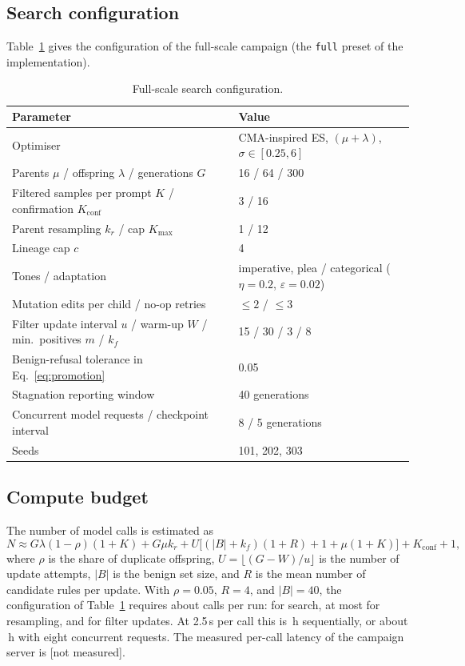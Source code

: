 \documentclass[preprint,12pt,authoryear]{elsarticle}
\newcommand{\nm}{[not measured]}
\begin{document}
\subsection{Search configuration}
Table~\ref{tab:config} gives the configuration of the full-scale campaign (the \texttt{full} preset of the implementation).

\begin{table}[t]
\centering
\caption{Full-scale search configuration.}
\label{tab:config}
\footnotesize
\begin{tabular}{@{}ll@{}}
\toprule
Parameter & Value \\
\midrule
Optimiser & CMA-inspired ES, $(\mu+\lambda)$, $\sigma\in[0.25,6]$ \\
Parents $\mu$ / offspring $\lambda$ / generations $G$ & 16 / 64 / 300 \\
Filtered samples per prompt $K$ / confirmation $K_{\mathrm{conf}}$ & 3 / 16 \\
Parent resampling $k_r$ / cap $K_{\max}$ & 1 / 12 \\
Lineage cap $c$ & 4 \\
Tones / adaptation & imperative, plea / categorical ($\eta=0.2$, $\varepsilon=0.02$) \\
Mutation edits per child / no-op retries & $\leq 2$ / $\leq 3$ \\
Filter update interval $u$ / warm-up $W$ / min.\ positives $m$ / $k_f$ & 15 / 30 / 3 / 8 \\
Benign-refusal tolerance in Eq.~\eqref{eq:promotion} & 0.05 \\
Stagnation reporting window & 40 generations \\
Concurrent model requests / checkpoint interval & 8 / 5 generations \\
Seeds & 101, 202, 303 \\
\bottomrule
\end{tabular}
\end{table}

\subsection{Compute budget}
\label{sec:budget}
The number of model calls is estimated as
\begin{equation}
N \approx G\lambda(1-\rho)(1+K) + G\mu k_r + U\big[(|B|+k_f)(1+R)+1+\mu(1+K)\big] + K_{\mathrm{conf}}+1,
\end{equation}
where $\rho$ is the share of duplicate offspring, $U=\lfloor (G-W)/u\rfloor$ is the number of update attempts, $|B|$ is the benign set size, and $R$ is the mean number of candidate rules per update. With $\rho=0.05$, $R=4$, and $|B|=40$, the configuration of Table~\ref{tab:config} requires about \budgetCalls{} calls per run: \budgetSearchCalls{} for search, at most \budgetResampleCalls{} for resampling, and \budgetFilterCalls{} for filter updates. At 2.5\,s per call this is \budgetHoursSequential{}\,h sequentially, or about \budgetHours{}\,h with eight concurrent requests. The measured per-call latency of the campaign server is \nm.
\end{document}

